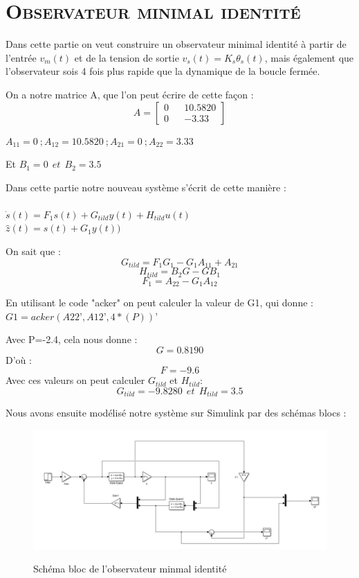 \section{\textsc{Observateur minimal identité}}
\par Dans cette partie on veut construire un observateur minimal identité à partir de l'entrée $v_m(t)$ et de la tension de sortie $v_s(t)=K_s\theta_s(t)$, mais également que l'observateur sois 4 fois plus rapide que la dynamique de la boucle fermée.
\par On a notre matrice A, que l'on peut écrire de cette façon :
    $$A = \begin{bmatrix}0 && 10.5820 \\0 && -3.33 \end{bmatrix}$$
\par $A_{11}=0~; A_{12}=10.5820~; A_{21}=0~; A_{22}=3.33$
\par Et $B_1 = 0~~et~~B_2 = 3.5$
\par Dans cette partie notre nouveau système s'écrit de cette manière :\\
~~\\
$\dot{s}(t) = F_1s(t) + G_{tild}y(t)+H_{tild}u(t)$\\
$\widehat{z}(t) = s(t) + G_1y(t))$
\par On sait que :
$$G_{tild} = F_1G_1 - G_1A_{11} + A_{21}$$
$$H_{tild} = B_2G - GB_1$$
$$F_1=A_{22} - G_1A_{12}$$
\par En utilisant le code "acker" on peut calculer la valeur de G1, qui donne :
$G1=acker(A22’,A12’,4*(P))’$
\par Avec P=-2.4, cela nous donne :
$$G = 0.8190$$
D'où :
$$F = -9.6$$
Avec ces valeurs on peut calculer $G_{tild}$ et $H_{tild}$:
$$G_{tild} = -9.8280~~et~~H_{tild} = 3.5$$
\par Nous avons ensuite modélisé notre système sur Simulink par des schémas blocs :
\begin{figure}[h!]
\centering
\includegraphics[scale = 0.35]{OBS_MINI.JPG}\\[0.7 cm] 
\caption{Schéma bloc de l'observateur minmal identité}
\end{figure}
